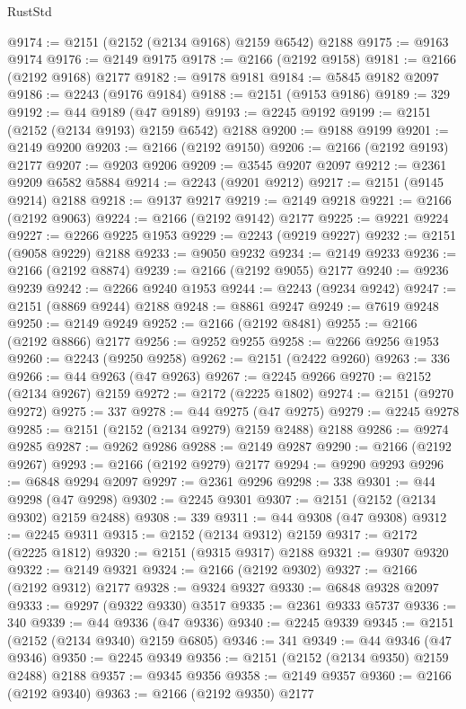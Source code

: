 \begin{lexlean}{RustStd}
\begin{coremodule}
@9174 := @2151 (@2152 (@2134 @9168) @2159 @6542) @2188
@9175 := @9163 @9174
@9176 := @2149 @9175
@9178 := @2166 (@2192 @9158)
@9181 := @2166 (@2192 @9168) @2177
@9182 := @9178 @9181
@9184 := @5845 @9182 @2097
@9186 := @2243 (@9176 @9184)
@9188 := @2151 (@9153 @9186)
@9189 := 329
@9192 := @44 @9189 (@47 @9189)
@9193 := @2245 @9192
@9199 := @2151 (@2152 (@2134 @9193) @2159 @6542) @2188
@9200 := @9188 @9199
@9201 := @2149 @9200
@9203 := @2166 (@2192 @9150)
@9206 := @2166 (@2192 @9193) @2177
@9207 := @9203 @9206
@9209 := @3545 @9207 @2097
@9212 := @2361 @9209 @6582 @5884
@9214 := @2243 (@9201 @9212)
@9217 := @2151 (@9145 @9214) @2188
@9218 := @9137 @9217
@9219 := @2149 @9218
@9221 := @2166 (@2192 @9063)
@9224 := @2166 (@2192 @9142) @2177
@9225 := @9221 @9224
@9227 := @2266 @9225 @1953
@9229 := @2243 (@9219 @9227)
@9232 := @2151 (@9058 @9229) @2188
@9233 := @9050 @9232
@9234 := @2149 @9233
@9236 := @2166 (@2192 @8874)
@9239 := @2166 (@2192 @9055) @2177
@9240 := @9236 @9239
@9242 := @2266 @9240 @1953
@9244 := @2243 (@9234 @9242)
@9247 := @2151 (@8869 @9244) @2188
@9248 := @8861 @9247
@9249 := @7619 @9248
@9250 := @2149 @9249
@9252 := @2166 (@2192 @8481)
@9255 := @2166 (@2192 @8866) @2177
@9256 := @9252 @9255
@9258 := @2266 @9256 @1953
@9260 := @2243 (@9250 @9258)
@9262 := @2151 (@2422 @9260)
@9263 := 336
@9266 := @44 @9263 (@47 @9263)
@9267 := @2245 @9266
@9270 := @2152 (@2134 @9267) @2159
@9272 := @2172 (@2225 @1802)
@9274 := @2151 (@9270 @9272)
@9275 := 337
@9278 := @44 @9275 (@47 @9275)
@9279 := @2245 @9278
@9285 := @2151 (@2152 (@2134 @9279) @2159 @2488) @2188
@9286 := @9274 @9285
@9287 := @9262 @9286
@9288 := @2149 @9287
@9290 := @2166 (@2192 @9267)
@9293 := @2166 (@2192 @9279) @2177
@9294 := @9290 @9293
@9296 := @6848 @9294 @2097
@9297 := @2361 @9296
@9298 := 338
@9301 := @44 @9298 (@47 @9298)
@9302 := @2245 @9301
@9307 := @2151 (@2152 (@2134 @9302) @2159 @2488)
@9308 := 339
@9311 := @44 @9308 (@47 @9308)
@9312 := @2245 @9311
@9315 := @2152 (@2134 @9312) @2159
@9317 := @2172 (@2225 @1812)
@9320 := @2151 (@9315 @9317) @2188
@9321 := @9307 @9320
@9322 := @2149 @9321
@9324 := @2166 (@2192 @9302)
@9327 := @2166 (@2192 @9312) @2177
@9328 := @9324 @9327
@9330 := @6848 @9328 @2097
@9333 := @9297 (@9322 @9330) @3517
@9335 := @2361 @9333 @5737
@9336 := 340
@9339 := @44 @9336 (@47 @9336)
@9340 := @2245 @9339
@9345 := @2151 (@2152 (@2134 @9340) @2159 @6805)
@9346 := 341
@9349 := @44 @9346 (@47 @9346)
@9350 := @2245 @9349
@9356 := @2151 (@2152 (@2134 @9350) @2159 @2488) @2188
@9357 := @9345 @9356
@9358 := @2149 @9357
@9360 := @2166 (@2192 @9340)
@9363 := @2166 (@2192 @9350) @2177

\end{coremodule}
\end{lexlean}
